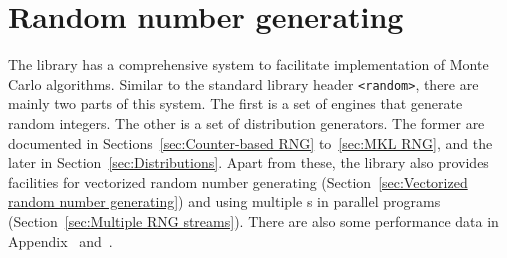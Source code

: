%
%
%
%

\chapter{Random number generating}
\label{chap:Random number generating}

The library has a comprehensive \rng system to facilitate implementation of
Monte Carlo algorithms. Similar to the standard library header \verb|<random>|,
there are mainly two parts of this system. The first is a set of \rng{} engines
that generate random integers. The other is a set of distribution generators.
The former are documented in Sections~\ref{sec:Counter-based RNG}
to~\ref{sec:MKL RNG}, and the later in Section~\ref{sec:Distributions}. Apart
from these, the library also provides facilities for vectorized random number
generating (Section~\ref{sec:Vectorized random number generating}) and using
multiple \rng{}s in parallel programs (Section~\ref{sec:Multiple RNG streams}).
There are also some performance data in Appendix~ and~.

